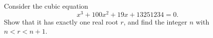 Consider the cubic equation
\[x^3+100x^2+19x+13251234=0.\]
Show that it has exactly one real root $r$, and find the integer $n$ with $n<r<n+1$.
